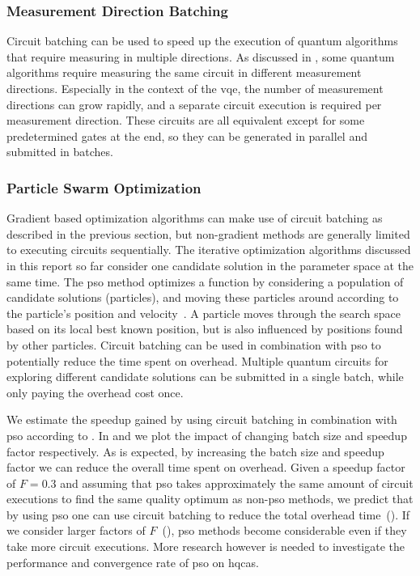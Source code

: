 \subsubsection{Measurement Direction Batching}
Circuit batching can be used to speed up the execution of quantum algorithms that require measuring in multiple directions.
As discussed in , some quantum algorithms require measuring the same circuit in different measurement directions.
Especially in the context of the \gls{vqe}, the number of measurement directions can grow rapidly, and a separate circuit execution is required per measurement direction.
These circuits are all equivalent except for some predetermined gates at the end, so they can be generated in parallel and submitted in batches.

\subsubsection{Particle Swarm Optimization}
Gradient based optimization algorithms can make use of circuit batching as described in the previous section, but non-gradient methods are generally limited to executing circuits sequentially.
The iterative optimization algorithms discussed in this report so far consider one candidate solution in the parameter space at the same time.
The \gls{pso} method optimizes a function by considering a population of candidate solutions (particles), and moving these particles around according to  the particle's position and velocity~\cite{kennedy1995particle, shi1998modified}.
A particle moves through the search space based on its local best known position, but is also influenced by positions found by other particles.
Circuit batching can be used in combination with \gls{pso} to potentially reduce the time spent on overhead.
Multiple quantum circuits for exploring different candidate solutions can be submitted in a single batch, while only paying the overhead cost once.

We estimate the speedup gained by using circuit batching in combination with \gls{pso} according to .
In  and  we plot the impact of changing batch size and speedup factor respectively.
As is expected, by increasing the batch size and speedup factor we can reduce the overall time spent on overhead.
Given a speedup factor of $F = 0.3$ and assuming that \gls{pso} takes approximately the same amount of circuit executions to find the same quality optimum as non-\gls{pso} methods, we predict that by using \gls{pso} one can use circuit batching to reduce the total overhead time~().
If we consider larger factors of $F$~(), \gls{pso} methods become considerable even if they take more circuit executions.
More research however is needed to investigate the performance and convergence rate of \gls{pso} on \glspl{hqca}.

